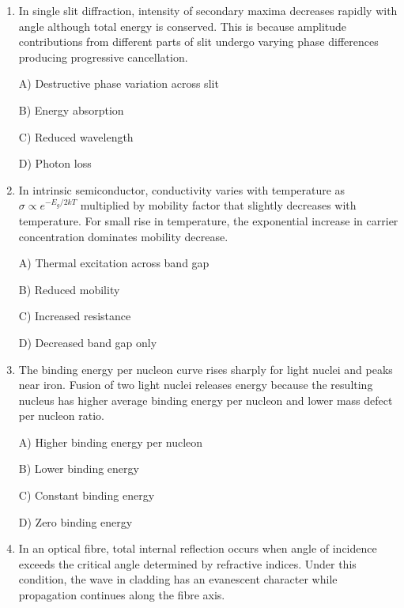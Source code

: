 \documentclass[12pt]{article}
\begin{document}
\begin{enumerate}[leftmargin=*]
B) Intensity  

C) Photon momentum  

D) Surface area  


\item In single slit diffraction, intensity of secondary maxima decreases rapidly with angle although total energy is conserved. This is because amplitude contributions from different parts of slit undergo varying phase differences producing progressive cancellation.  

A) Destructive phase variation across slit  

B) Energy absorption  

C) Reduced wavelength  

D) Photon loss  


\item In intrinsic semiconductor, conductivity varies with temperature as \(\sigma \propto e^{-E_g/2kT}\) multiplied by mobility factor that slightly decreases with temperature. For small rise in temperature, the exponential increase in carrier concentration dominates mobility decrease.  

A) Thermal excitation across band gap  

B) Reduced mobility  

C) Increased resistance  

D) Decreased band gap only  


\item The binding energy per nucleon curve rises sharply for light nuclei and peaks near iron. Fusion of two light nuclei releases energy because the resulting nucleus has higher average binding energy per nucleon and lower mass defect per nucleon ratio.  

A) Higher binding energy per nucleon  

B) Lower binding energy  

C) Constant binding energy  

D) Zero binding energy  


\item In an optical fibre, total internal reflection occurs when angle of incidence exceeds the critical angle determined by refractive indices. Under this condition, the wave in cladding has an evanescent character while propagation continues along the fibre axis.  

\begin{center}
\end{center}
\end{enumerate}
\end{document}
